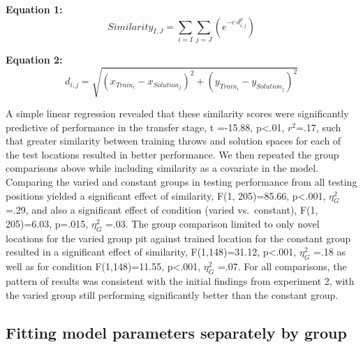 \documentclass[
  12pt,
  letterpaper,
]{article}
\begin{document}
\textbf{Equation 1:} \[ Similarity_{I,J} = \sum_{i=I}\sum_{j=J}
(e^{-c^\cdot d^{p}_{i,j}}) \]

\textbf{Equation 2:}
\[ d_{i,j} = \sqrt{(x_{Train_i}-x_{Solution_j})^2 + (y_{Train_i}-y_{Solution_j})^2 } \]

A simple linear regression revealed that these similarity scores were
significantly predictive of performance in the transfer stage, t
=-15.88, p\textless.01, \(r^2\)=.17, such that greater similarity
between training throws and solution spaces for each of the test
locations resulted in better performance. We then repeated the group
comparisons above while including similarity as a covariate in the
model. Comparing the varied and constant groups in testing performance
from all testing positions yielded a significant effect of similarity,
F(1, 205)=85.66, p\textless.001, \(\eta^{2}_G\) =.29, and also a
significant effect of condition (varied vs.~constant), F(1, 205)=6.03,
p=.015, \(\eta^{2}_G\) =.03. The group comparison limited to only novel
locations for the varied group pit against trained location for the
constant group resulted in a significant effect of similarity,
F(1,148)=31.12, p\textless.001, \(\eta^{2}_G\) =.18 as well as for
condition F(1,148)=11.55, p\textless.001, \(\eta^{2}_G\) =.07. For all
comparisons, the pattern of results was consistent with the initial
findings from experiment 2, with the varied group still performing
significantly better than the constant group.

\subsection{Fitting model parameters separately by
group}\label{fitting-model-parameters-separately-by-group}
\end{document}
